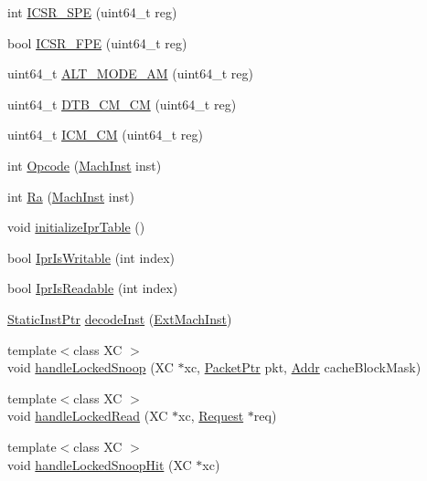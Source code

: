 \begin{DoxyCompactItemize}
\item 
int \hyperlink{namespaceAlphaISA_a1296f5f4491f6eafcd4cac6c96b2ceb4}{ICSR\_\-SPE} (uint64\_\-t reg)
\item 
bool \hyperlink{namespaceAlphaISA_ad98e58e7430195419d36c46d7bfb1af2}{ICSR\_\-FPE} (uint64\_\-t reg)
\item 
uint64\_\-t \hyperlink{namespaceAlphaISA_aea45c43f418ab3870323f1826f2a5038}{ALT\_\-MODE\_\-AM} (uint64\_\-t reg)
\item 
uint64\_\-t \hyperlink{namespaceAlphaISA_ad60009a95542d624d42cf5134774bda8}{DTB\_\-CM\_\-CM} (uint64\_\-t reg)
\item 
uint64\_\-t \hyperlink{namespaceAlphaISA_a95f34da1a383722d1e64b076a35cdcd9}{ICM\_\-CM} (uint64\_\-t reg)
\item 
int \hyperlink{namespaceAlphaISA_a9a4cdce6243495f64ef6cc1c6912da10}{Opcode} (\hyperlink{namespaceAlphaISA_a301c22ea09fa33dcfe6ddf22f203699c}{MachInst} inst)
\item 
int \hyperlink{namespaceAlphaISA_a5fb6bfaf48ec71f9e3354545d3aa85ff}{Ra} (\hyperlink{namespaceAlphaISA_a301c22ea09fa33dcfe6ddf22f203699c}{MachInst} inst)
\item 
void \hyperlink{namespaceAlphaISA_abc1bf54037f3c4812019fa985607bbd2}{initializeIprTable} ()
\item 
bool \hyperlink{namespaceAlphaISA_aa3cf21b4a9cdea68799e13e18f44d3d4}{IprIsWritable} (int index)
\item 
bool \hyperlink{namespaceAlphaISA_a7d31db1cc7ca61db4f288b9e525922e1}{IprIsReadable} (int index)
\item 
\hyperlink{classRefCountingPtr}{StaticInstPtr} \hyperlink{namespaceAlphaISA_aef30743e4d38e3498eb69d368026c8f8}{decodeInst} (\hyperlink{namespaceAlphaISA_aec686c38e40c7f794f1435591c15c275}{ExtMachInst})
\item 
{\footnotesize template$<$class XC $>$ }\\void \hyperlink{namespaceAlphaISA_aae6ad66df5dfd5de14b36293aaf2e7f1}{handleLockedSnoop} (XC $\ast$xc, \hyperlink{classPacket}{PacketPtr} pkt, \hyperlink{classm5_1_1params_1_1Addr}{Addr} cacheBlockMask)
\item 
{\footnotesize template$<$class XC $>$ }\\void \hyperlink{namespaceAlphaISA_a00333a272d42606a01cc33c81999a58b}{handleLockedRead} (XC $\ast$xc, \hyperlink{classRequest}{Request} $\ast$req)
\item 
{\footnotesize template$<$class XC $>$ }\\void \hyperlink{namespaceAlphaISA_a300fd7902bc6b2f2407c79f776d92ee8}{handleLockedSnoopHit} (XC $\ast$xc)

\end{DoxyCompactItemize}
